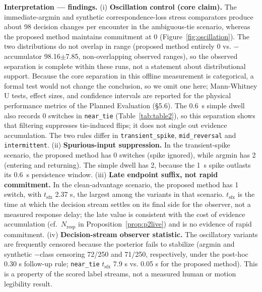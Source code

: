 \documentclass[11pt]{article}
\newcommand{\code}[1]{\texttt{#1}}
\begin{document}
\textbf{Interpretation --- findings.} (i) \textbf{Oscillation control (core claim).} The immediate-argmin and synthetic correspondence-loss stress comparators produce about 98 decision changes per encounter in the ambiguous-tie scenario, whereas the proposed method maintains commitment at 0 (Figure~\ref{fig:oscillation}). The two distributions do not overlap in range (proposed method entirely 0 vs. $-$accumulator 98.16$\pm$7.85, non-overlapping observed ranges), so the observed separation is complete within these runs, not a statement about distributional support. Because the core separation in this offline measurement is categorical, a formal test would not change the conclusion, so we omit one here; Mann-Whitney U tests, effect sizes, and confidence intervals are reported for the physical performance metrics of the Planned Evaluation (\S5.6). The 0.6~s simple dwell also records 0 switches in \code{near\_tie} (Table~\ref{tab:table2}), so this separation shows that filtering suppresses tie-induced flips; it does not single out evidence accumulation. The two rules differ in \code{transient\_spike}, \code{mid\_reversal} and \code{intermittent}. (ii) \textbf{Spurious-input suppression.} In the transient-spike scenario, the proposed method has 0 switches (spike ignored), while argmin has 2 (entering and returning). The simple dwell has 2, because the 1~s spike outlasts its 0.6~s persistence window. (iii) \textbf{Late endpoint suffix, not rapid commitment.} In the clean-advantage scenario, the proposed method has 1 switch, with $t_{\text{sfx}}$ 2.37 s, the largest among the variants in that scenario. $t_{\text{sfx}}$ is the time at which the decision stream settles on its final side for the observer, not a measured response delay; the late value is consistent with the cost of evidence accumulation (cf.\ $N_{\text{resp}}$ in Proposition~\ref{prop:p2live}) and is no evidence of rapid commitment. (iv) \textbf{Decision-stream observer statistic.} The oscillatory variants are frequently censored because the posterior fails to stabilize (argmin and synthetic $-$class censoring 72/250 and 71/250, respectively, under the post-hoc 0.30 s follow-up rule; \code{near\_tie} $t_{\text{sfx}}$ 7.9 s vs. 0.05 s for the proposed method). This is a property of the scored label streams, not a measured human or motion legibility result.
\end{document}
